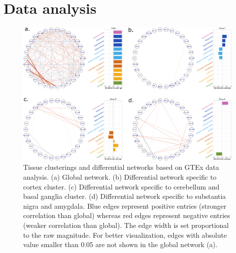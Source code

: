 \documentclass[11pt]{article}
\theoremstyle{plain}
\theoremstyle{definition}
\begin{document}
\section{Data analysis}
\begin{table}[H]
\caption{Tissue clustering for 13 brain tissues with $p=500$ top variable genes, $r=3$, $\rho=1500$.}\label{tab:summary}
\end{table}



\begin{figure}[H]
  \centering
  \includegraphics[width=\textwidth]{network_500}
  \caption{Tissue clusterings and differential networks based on GTEx data analysis. (a) Global network. (b) Differential network specific to cortex cluster. (c) Differential network specific to cerebellum and basal ganglia cluster. (d) Differential network specific to substantia nigra and amygdala. Blue edges represent positive entries (stronger correlation than global) whereas red edges represent negative entries (weaker correlation than global). The edge width is set proportional to the raw magnitude. For better visualization, edges with absolute value smaller than 0.05 are not shown in the global network (a). }
\end{figure}
\end{document}
